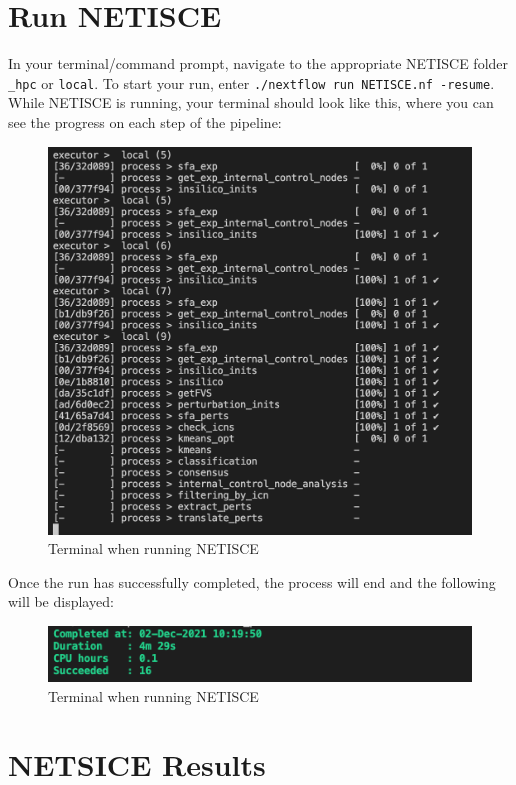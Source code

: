 \documentclass[
]{book}
\begin{document}
\hypertarget{run-netisce}{%
\section{Run NETISCE}\label{run-netisce}}

In your terminal/command prompt, navigate to the appropriate NETISCE folder \texttt{\_hpc} or \texttt{local}. To start your run, enter \texttt{./nextflow\ run\ NETISCE.nf\ -resume}.
While NETISCE is running, your terminal should look like this, where you can see the progress on each step of the pipeline:

\begin{figure}

{\centering \includegraphics[width=0.5\linewidth]{images/running_shot} 

}

\caption{Terminal when running NETISCE}\label{fig:unnamed-chunk-7}
\end{figure}

Once the run has successfully completed, the process will end and the following will be displayed:

\begin{figure}

{\centering \includegraphics[width=0.5\linewidth]{images/completed} 

}

\caption{Terminal when running NETISCE}\label{fig:unnamed-chunk-8}
\end{figure}

\hypertarget{netsice-results}{%
\section{NETSICE Results}\label{netsice-results}}
\end{document}
